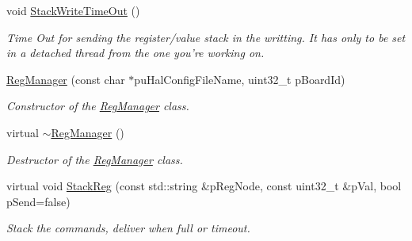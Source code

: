 \begin{CompactItemize}
void \hyperlink{class_ph2___hw_interface_1_1_reg_manager_b4e24cf318772c09a6c7e24b88b1dedb}{Stack\-Write\-Time\-Out} ()
\begin{CompactList}\small\item\em Time Out for sending the register/value stack in the writting. It has only to be set in a detached thread from the one you're working on. \item\end{CompactList}\item 
\hyperlink{class_ph2___hw_interface_1_1_reg_manager_fc90c93f9e6771d2bf841883567b9eeb}{Reg\-Manager} (const char $\ast$pu\-Hal\-Config\-File\-Name, uint32\_\-t p\-Board\-Id)
\begin{CompactList}\small\item\em Constructor of the \hyperlink{class_ph2___hw_interface_1_1_reg_manager}{Reg\-Manager} class. \item\end{CompactList}\item 
virtual \hyperlink{class_ph2___hw_interface_1_1_reg_manager_5d650c4e6467153f98f999abbbfc354c}{$\sim$Reg\-Manager} ()
\begin{CompactList}\small\item\em Destructor of the \hyperlink{class_ph2___hw_interface_1_1_reg_manager}{Reg\-Manager} class. \item\end{CompactList}\item 
virtual void \hyperlink{class_ph2___hw_interface_1_1_reg_manager_409c95948e25ea5fb7f897926e9de1e6}{Stack\-Reg} (const std::string \&p\-Reg\-Node, const uint32\_\-t \&p\-Val, bool p\-Send=false)
\begin{CompactList}\small\item\em Stack the commands, deliver when full or timeout. \item\end{CompactList}\end{CompactItemize}
